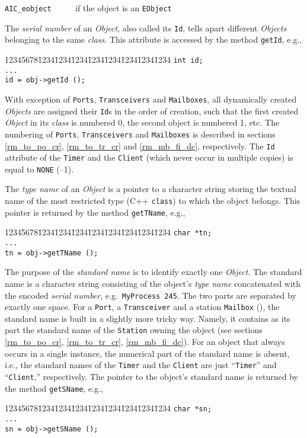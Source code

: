 \noindent
{\tt AIC\_eobject~~~~~} if the object is an {\tt EObject}

\bigskip

The {\em serial number\/}
of an {\em Object}, also called its {\tt Id}, tells apart
different {\em Objects\/} belonging to the same {\em class}.
This attribute is accessed by the method {\tt getId}, e.g.,
{\tt\begin{tabbing}
12345678\=1234\=1234\=1234\=1234\=1234\=1234\=1234\=1234\kill
 \> {\tt int  id;}\\
 \> {\tt ...}\\
 \> {\tt id = obj->getId ();}
\end{tabbing}}

With exception of {\tt Ports}, {\tt Transceivers} and {\tt Mailboxes},
all dynamically created
{\em Objects\/} are assigned their {\tt Id}s in the order of creation, such
that the first created {\em Object\/} in its {\em class} is numbered 0,
the second object is numbered 1, etc.
The numbering of {\tt Ports}, {\tt Transceivers} and {\tt Mailboxes}
is described in sections \ref{rm_to_po_cr}, \ref{rm_to_tr_cr} and
\ref{rm_mb_fi_dc}, respectively.
The {\tt Id} attribute of
the {\tt Timer} and the {\tt Client} (which never occur in multiple copies)
is equal to {\tt NONE} (--1).

The {\em type name\/} of an {\em Object\/} is a pointer to a character string
storing the textual name of the most restricted
type (C++ {\tt class}) to which the object belongs.
This pointer is returned by the method
{\tt getTName}, e.g.,
{\tt\begin{tabbing}
12345678\=1234\=1234\=1234\=1234\=1234\=1234\=1234\=1234\kill
 \> {\tt char *tn;}\\
 \> {\tt ...}\\
 \> {\tt tn = obj->getTName ();}
\end{tabbing}}

The purpose of the {\em standard name\/} is to identify exactly one
{\em Object}.
The standard name is a character string consisting of the object's
{\em type name\/} concatenated with the encoded {\em serial number}, e.g.\ 
{\tt MyProcess~245}.
The two parts are separated by exactly one space.
For a {\tt Port}, a {\tt Transceiver} and a station {\tt Mailbox}
(\sect{rm_mb_fi_dc}),
the standard name is built in a slightly more tricky way.
Namely, it contains as its part the standard name of the {\tt Station}
owning the object (see sections \ref{rm_to_po_cr}, \ref{rm_to_tr_cr},
\ref{rm_mb_fi_dc}).
For an object that always occurs in a single instance, the numerical part of
the standard name is absent, i.e., the standard names of the {\tt Timer}
and the {\tt Client} are just ``{\tt Timer}'' and ``{\tt Client},''
respectively.
The pointer to the object's standard name is returned by the method
{\tt getSName}, e.g.,
{\tt\begin{tabbing}
12345678\=1234\=1234\=1234\=1234\=1234\=1234\=1234\=1234\kill
 \> {\tt char *sn;}\\
 \> {\tt ...}\\
 \> {\tt sn = obj->getSName ();}
\end{tabbing}}


